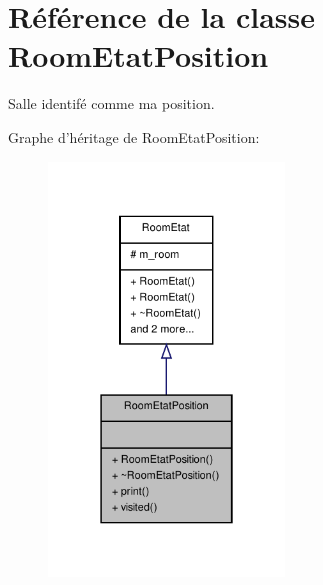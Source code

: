 \hypertarget{class_room_etat_position}{\section{Référence de la classe Room\-Etat\-Position}
\label{class_room_etat_position}
}


Salle identifé comme ma position.  




Graphe d'héritage de Room\-Etat\-Position\-:
\nopagebreak
\begin{figure}[H]
\begin{center}
\leavevmode
\includegraphics[width=178pt]{class_room_etat_position__inherit__graph}
\end{center}
\end{figure}


